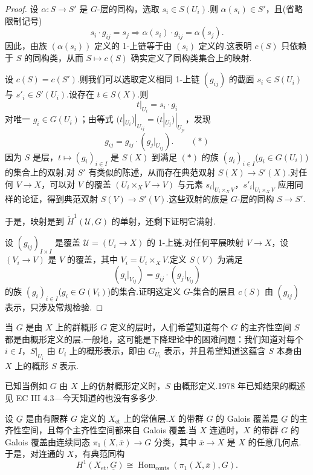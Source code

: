 \begin{proof}
设 $\alpha \colon S \to S'$ 是 $G$-层的同构，选取 $s_i \in S(U_i)$.则 $\alpha(s_i) \in S'$，且(省略限制记号)
\[
s_i \cdot g_{ij} = s_j \Rightarrow \alpha(s_i) \cdot g_{ij} = \alpha(s_j).
\]
因此，由族 $(\alpha(s_i))$ 定义的 1-上链等于由 $(s_i)$ 定义的.这表明 $c(S)$ 只依赖于 $S$ 的同构类，从而 $S \mapsto c(S)$ 确实定义了同构类集合上的映射.

设 $c(S) = c(S')$.则我们可以选取定义相同 1-上链 $(g_{ij})$ 的截面 $s_i \in S(U_i)$ 与 $s'_i \in S'(U_i)$.设存在 $t \in S(X)$.则
\[
t|_{U_i} = s_i \cdot g_i
\]
对唯一 $g_i \in G(U_i)$；由等式 $(t|_{U_i})|_{U_{ij}} = (t|_{U_j})|_{U_{ji}}$，发现
\[
g_{ij} = g_{ij} \cdot (g_j|_{U_{ij}}). \qquad (*)
\]
因为 $S$ 是层，$t \mapsto (g_i)_{i \in I}$ 是 $S(X)$ 到满足 $(*)$ 的族 $(g_i)_{i \in I}$($g_i \in G(U_i)$)的集合上的双射.对 $S'$ 有类似的陈述，从而存在典范双射 $S(X) \to S'(X)$.对任何 $V \to X$，可以对 $V$ 的覆盖 $(U_i \times_{X} V \to V)$ 与元素 $s_i|_{U_i \times_{X} V}$，$s'_i|_{U_i \times_{X} V}$ 应用同样的论证，得到典范双射 $S(V) \to S'(V)$.这些双射的族是 $G$-层的同构 $S \to S'$.

于是，映射是到 $\check{H}^{1}(\mathcal{U}, G)$ 的单射，还剩下证明它满射.

设 $(g_{ij})_{I \times I}$ 是覆盖 $\mathcal{U} = (U_i \to X)$ 的 1-上链.对任何平展映射 $V \to X$，设 $(V_i \to V)$ 是 $V$ 的覆盖，其中 $V_i = U_i \times_{X} V$.定义 $S(V)$ 为满足
\[
(g_i|_{V_{ij}}) = g_{ij} \cdot (g_j|_{V_{ij}})
\]
的族 $(g_i)_{i \in I}$($g_i \in G(V_i)$)的集合.证明这定义 $G$-集合的层且 $c(S)$ 由 $(g_{ij})$ 表示，只涉及常规检验.
\end{proof}

\begin{remark}\label{rem:11.2}
当 $G$ 是由 $X$ 上的群概形 $G$ 定义的层时，人们希望知道每个 $G$ 的主齐性空间 $S$ 都是由概形定义的层.一般地，这可能是下降理论中的困难问题：我们知道对每个 $i \in I$，$S|_{U_i}$ 由 $U_i$ 上的概形表示，即由 $G_{U_i}$ 表示，并且希望知道这蕴含 $S$ 本身由 $X$ 上的概形 $S$ 表示.

已知当例如 $G$ 由 $X$ 上的仿射概形定义时，$S$ 由概形定义.1978 年已知结果的概述见 EC III 4.3---今天知道的也没有多多少.
\end{remark}

\begin{example}\label{ex:11.3}
设 $\underline{G}$ 是由有限群 $G$ 定义的 $X_{\mathrm{et}}$ 上的常值层.$X$ 的带群 $G$ 的 Galois 覆盖是 $\underline{G}$ 的主齐性空间，且每个主齐性空间都来自 Galois 覆盖.当 $X$ 连通时，$X$ 的带群 $G$ 的 Galois 覆盖由连续同态 $\pi_1(X, \bar{x}) \to G$ 分类，其中 $\bar{x} \to X$ 是 $X$ 的任意几何点.于是，对连通的 $X$，有典范同构
\[
H^{1}(X_{\mathrm{et}}, \underline{G}) \cong \operatorname{Hom}_{\mathrm{conts}}(\pi_1(X, \bar{x}), G).
\]
\end{example}

